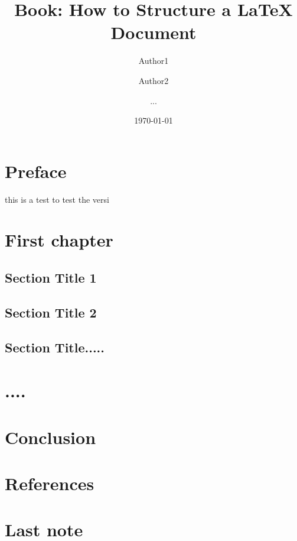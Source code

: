 \documentclass[11pt,a4paper]{book}
\begin{document}
\title{Book: How to Structure a LaTeX Document}
\author{Author1 \and Author2 \and ...}
\date{\today}

\maketitle

\frontmatter

\chapter{Preface}
this is a test to test the versi
\mainmatter
\chapter{First chapter}
\section{Section Title 1}
\section{Section Title 2}
\section{Section Title.....}

\chapter{....}

\chapter{Conclusion}

\chapter*{References}


\backmatter
\chapter{Last note}
\end{document}
